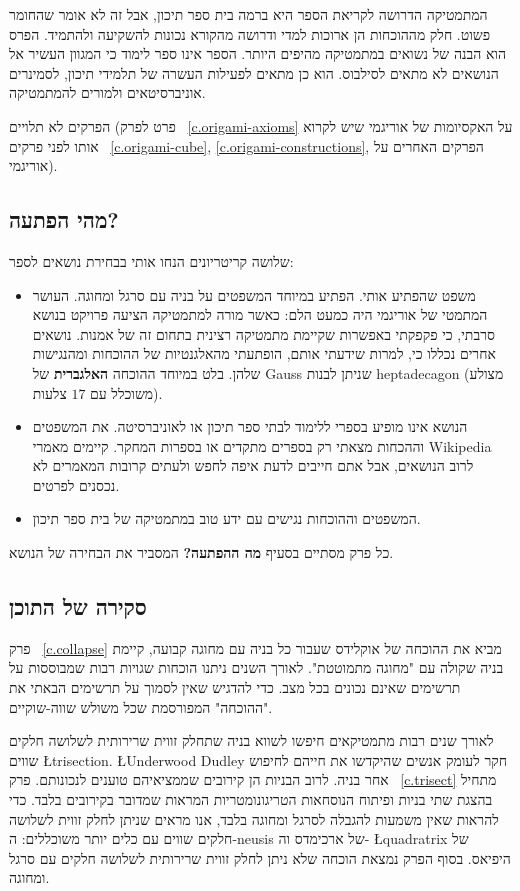 המתמטיקה הדרושה לקריאת הספר היא ברמה בית ספר תיכון, אבל זה לא אומר שהחומר פשוט. חלק מההוכחות הן ארוכות למדי ודרושה מהקורא נכונות להשקיעה ולהתמיד. הפרס הוא הבנה של נשואים במתמטיקה מהיפים היותר. הספר אינו ספר לימוד כי המגוון העשיר אל הנושאים לא מתאים לסילבוס. הוא כן מתאים לפעילות העשרה של תלמידי תיכון, לסמינרים אוניברסיטאים ולמורים להמתמטיקה.


הפרקים לא תלויים (פרט לפרק~%
\ref{c.origami-axioms}
על האקסיומות של אוריגמי שיש לקרוא אותו לפני פרקים~%
\ref{c.origami-cube}, \ref{c.origami-constructions},
הפרקים האחרים על אוריגמי).

\subsection*{מהי הפתעה?}

שלושה קריטריונים הנחו אותי בבחירת נושאים לספר:
\begin{itemize}
\item 
משפט שהפתיע אותי. הפתיע במיוחד המשפטים על בניה עם סרגל ומחוגה. העושר המתמטי של אוריגמי היה כמעט הלם: כאשר מורה למתמטיקה הציעה פרויקט בנושא סרבתי, כי פקפקתי באפשרות שקיימת מתמטיקה רצינית בתחום זה של אמנות. נושאים אחרים נכללו כי, למרות שידעתי אותם, הופתעתי מהאלגנטיות של ההוכחות ומהנגישות שלהן. בלט במיוחד ההוכחה 
\textbf{האלגברית}
של Gauss שניתן לבנות heptadecagon (מצולע משוכלל עם $17$ צלעות).

\item
הנושא אינו מופיע בספרי ללימוד לבתי ספר תיכון או לאוניברסיטה. את המשפטים וההכחות מצאתי רק בספרים מתקדים או בספרות המחקר. קיימים מאמרי Wikipedia לרוב הנושאים, אבל אתם חייבים לדעת איפה לחפש ולעתים קרובות המאמרים לא נכסנים לפרטים.

\item
המשפטים וההוכחות נגישים עם ידע טוב במתמטיקה של בית ספר תיכון.
\end{itemize}
כל פרק מסתיים בסעיף 
\textbf{מה ההפתעה?}
המסביר את הבחירה של הנושא.

\subsection*{סקירה של התוכן}


פרק~%
\ref{c.collapse}
מביא את ההוכחה של אוקלידס שעבור כל בניה עם מחוגה קבועה, קיימת בניה שקולה עם "מחוגה מתמוטטת". לאורך השנים ניתנו הוכחות שגויות רבות שמבוססות על תרשימים שאינם נכונים בכל מצב. כדי להדגיש שאין לסמוך על תרשימים הבאתי את "ההוכחה" המפורסמת שכל משולש שווה-שוקיים.

לאורך שנים רבות מתמטיקאים חיפשו לשווא בניה שתחלק זווית שרירותית לשלושה חלקים שווים
\L{trisection}.
\L{Underwood Dudley}
חקר לעומק אנשים שהיקדשו את חייהם לחיפוש אחר בניה. לרוב הבניות הן קירובים שממציאיהם טוענים לנכונותם. פרק~%
\ref{c.trisect}
מתחיל בהצגת שתי בניות ופיתוח הנוסחאות הטריגונומטריות המראות שמדובר בקירובים בלבד. כדי להראות שאין משמעות להגבלה לסרגל ומחוגה בלבד, אנו מראים שניתן לחלק זווית לשלושה חלקים שווים עם כלים יותר משוכללים: ה-neusis של ארכימדס וה-%
\L{quadratrix}
של היפיאס. בסוף הפרק נמצאת הוכחה שלא ניתן לחלק זווית שרירותית לשלושה חלקים עם סרגל ומחוגה.

